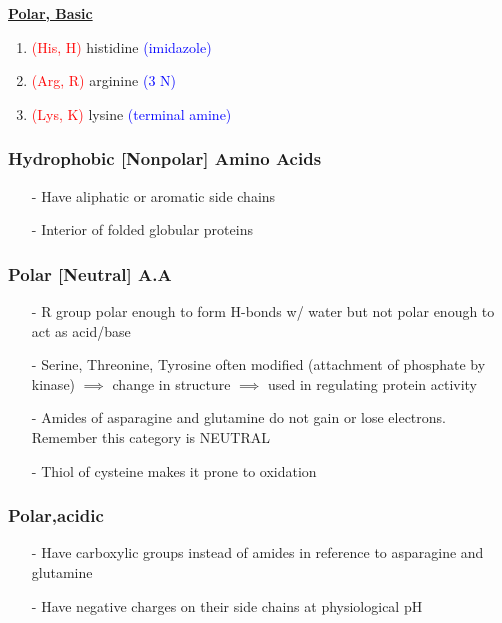 \documentclass[10pt,a4paper]{report}
\begin{document}
	\hspace{5em}
	\noindent\parbox[t]{3in}{\raggedright%
		\textbf{\underline{Polar, Basic}}
		\begin{enumerate}
			[topsep=2pt,itemsep=-2pt,leftmargin=13pt]
			\item \textcolor{red}{(His, H)} histidine \textcolor{blue}{(imidazole)}
			\item \textcolor{red}{(Arg, R)} arginine \textcolor{blue}{(3 N)}
			\item \textcolor{red}{(Lys, K)} lysine \textcolor{blue}{(terminal amine)}
		\end{enumerate}
	}
	\newpage
	\subsubsection{Hydrophobic [Nonpolar] Amino Acids}
	\begin{enumerate}
		[topsep=2pt,itemsep=-2pt,leftmargin=13pt]
		\item[-] Have aliphatic or aromatic side chains
		\item[-] Interior of folded globular proteins
	\end{enumerate}
	
	\subsubsection{Polar [Neutral] A.A}
	\begin{enumerate}
		[topsep=2pt,itemsep=-2pt,leftmargin=13pt]
		\item[-] R group polar enough to form H-bonds w/ water but not polar enough to act as acid/base
		\item[-] Serine, Threonine, Tyrosine often modified (attachment of phosphate by kinase) $\implies$ change in structure $\implies$ used in regulating protein activity
		\item[-] Amides of asparagine and glutamine do not gain or lose electrons. Remember this category is NEUTRAL
		\item [-] Thiol of cysteine makes it prone to oxidation
	\end{enumerate}
	
	\subsubsection{Polar,acidic}
	\begin{enumerate}
		[topsep=2pt,itemsep=-2pt,leftmargin=13pt]
		\item[-] Have carboxylic groups instead of amides in reference to asparagine and glutamine
		\item [-] Have negative charges on their side chains at physiological pH
	\end{enumerate}
	
\end{document}
